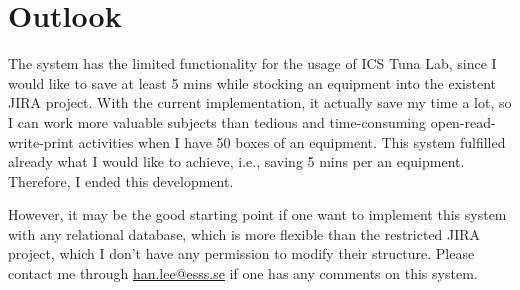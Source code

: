 \documentclass[11pt
  , a4paper
  , article
  , oneside
  , showtrims
]{memoir}
\begin{document}
\chapter{Outlook}

The system has the limited functionality for the usage of ICS Tuna Lab, since I would like to save at least 5 mins while stocking an equipment into the existent JIRA project. With the current implementation, it actually save my time a lot, so I can work more valuable subjects than tedious and time-consuming open-read-write-print activities when I have 50 boxes of an equipment. This system fulfilled already what I would like to achieve, i.e., saving 5 mins per an equipment. Therefore, I ended this development. 

However, it may be the good starting point if one want to implement this system with any relational database, which is more flexible than the restricted JIRA project, which I don't have any permission to modify their structure. Please contact me through \href{mailto:han.lee@esss.se}{han.lee@esss.se} if one has any comments on this system. 
\end{document}
